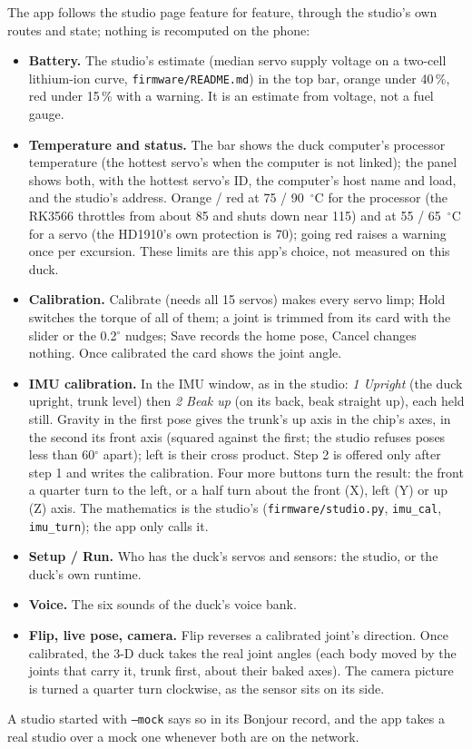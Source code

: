 \documentclass[11pt]{article}
\begin{document}
The app follows the studio page feature for feature, through the studio's own routes and state; nothing is
recomputed on the phone:
\begin{itemize}\itemsep0pt
\item \textbf{Battery.} The studio's estimate (median servo supply voltage on a two-cell lithium-ion curve,
\texttt{firmware/README.md}) in the top bar, orange under 40\,\%, red under 15\,\% with a warning. It is an
estimate from voltage, not a fuel gauge.
\item \textbf{Temperature and status.} The bar shows the duck computer's processor temperature (the hottest
servo's when the computer is not linked); the panel shows both, with the hottest servo's ID, the computer's host
name and load, and the studio's address. Orange / red at 75 / 90~$^\circ$C for the processor (the RK3566 throttles
from about 85 and shuts down near 115) and at 55 / 65~$^\circ$C for a servo (the HD1910's own protection is 70);
going red raises a warning once per excursion. These limits are this app's choice, not measured on this duck.
\item \textbf{Calibration.} Calibrate (needs all 15 servos) makes every servo limp; Hold switches the torque of all
of them; a joint is trimmed from its card with the slider or the 0.2$^\circ$ nudges; Save records the home pose,
Cancel changes nothing. Once calibrated the card shows the joint angle.
\item \textbf{IMU calibration.} In the IMU window, as in the studio: \emph{1 Upright} (the duck upright, trunk
level) then \emph{2 Beak up} (on its back, beak straight up), each held still. Gravity in the first pose gives the
trunk's up axis in the chip's axes, in the second its front axis (squared against the first; the studio refuses
poses less than 60$^\circ$ apart); left is their cross product. Step 2 is offered only after step 1 and writes the
calibration. Four more buttons turn the result: the front a quarter turn to the left, or a half turn about the
front (X), left (Y) or up (Z) axis. The mathematics is the studio's (\texttt{firmware/studio.py},
\texttt{imu\_cal}, \texttt{imu\_turn}); the app only calls it.
\item \textbf{Setup / Run.} Who has the duck's servos and sensors: the studio, or the duck's own runtime.
\item \textbf{Voice.} The six sounds of the duck's voice bank.
\item \textbf{Flip, live pose, camera.} Flip reverses a calibrated joint's direction. Once calibrated, the 3-D
duck takes the real joint angles (each body moved by the joints that carry it, trunk first, about their baked
axes). The camera picture is turned a quarter turn clockwise, as the sensor sits on its side.
\end{itemize}
A studio started with \texttt{--mock} says so in its Bonjour record, and the app takes a real studio over a mock
one whenever both are on the network.
\end{document}
